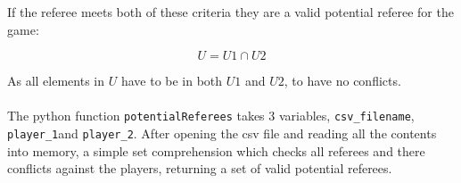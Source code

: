 \documentclass[a4paper]{article}
\begin{document}
If the referee meets both of these criteria they are a valid potential referee for the game:
\begin{center}
\begin{Large}
\begin{equation}\label{eq:U}
    U = U1 \cap U2
\end{equation}
\end{Large}
\end{center}
As all elements in $U$ have to be in both $U1$ and $U2$, to have no conflicts.
\\\\
The python function \verb+potentialReferees+ takes 3 variables, \verb+csv_filename+, \verb+player_1+and \verb+player_2+. After opening the csv file and reading all the contents into memory, a simple set comprehension which checks all referees and there conflicts against the players, returning a set of valid potential referees.
\end{document}

